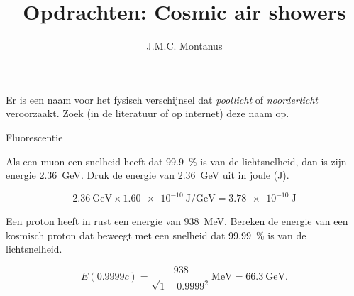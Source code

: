 

\title{Opdrachten: Cosmic air showers}
\author{J.M.C. Montanus}



\maketitle

\begin{questions}


\question Er is een naam voor het fysisch verschijnsel dat \emph{poollicht} of
\emph{noorderlicht} veroorzaakt. Zoek (in de literatuur of op internet)
deze naam op.
\begin{solution}
Fluorescentie
\end{solution}



\question Als een muon een snelheid heeft dat \SI{99.9}{\percent} is van de lichtsnelheid, dan
is zijn energie \SI{2.36}{\giga\electronvolt}. Druk de energie van
\SI{2.36}{\giga\electronvolt} uit in joule (\si{\joule}).
\begin{solution}
\begin{equation}
    \SI{2.36}{\giga\electronvolt} \times
    \SI{1.60e-10}{\joule\per\giga\electronvolt} = \SI{3.78e-10}{\joule}
    \nonumber
\end{equation}
\end{solution}

\question Een proton heeft in rust een energie van \SI{938}{\mega\electronvolt}.
Bereken de energie van een kosmisch proton dat beweegt met een snelheid
dat \SI{99.99}{\percent} is van de lichtsnelheid.
\begin{solution}
\begin{equation}
    E(\num{0.9999}c) = \frac{938}{\sqrt{1-\num{0.9999}^2}}\si{\mega\electronvolt}
    = \SI{66.3}{\giga\electronvolt}. \nonumber
\end{equation}
\end{solution}


\end{questions}
